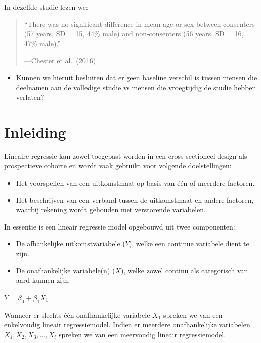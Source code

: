 \documentclass[
]{book}
\providecommand{\tightlist}{%
  \setlength{\itemsep}{0pt}\setlength{\parskip}{0pt}}
\theoremstyle{definition}
\theoremstyle{definition}
\theoremstyle{definition}
\theoremstyle{definition}
\theoremstyle{remark}
\begin{document}
In dezelfde studie lezen we:

\begin{quote}
``There was no significant difference in mean age or sex between consenters (57 years, SD = 15, 44\% male) and non-consenters (56 years, SD = 16, 47\% male).''

---Chester et al.~(2016)
\end{quote}

\begin{itemize}
\tightlist
\item
  Kunnen we hieruit besluiten dat er geen baseline verschil is tussen mensen die deelnamen aan de volledige studie vs mensen die vroegtijdig de studie hebben verlaten?
\end{itemize}

\hypertarget{inleiding-1}{%
\section*{Inleiding}\label{inleiding-1}}


Lineaire regressie kan zowel toegepast worden in een cross-sectioneel design als prospectieve cohorte en wordt vaak gebruikt voor volgende doelstellingen:

\begin{itemize}
\tightlist
\item
  Het voorspellen van een uitkomstmaat op basis van één of meerdere factoren.
\item
  Het beschrijven van een verband tussen de uitkomstmaat en andere factoren, waarbij rekening wordt gehouden met verstorende variabelen.
\end{itemize}

In essentie is een lineair regressie model opgebouwd uit twee componenten:

\begin{itemize}
\tightlist
\item
  De afhankelijke uitkomstvariabele (\(Y\)), welke een continue variabele dient te zijn.
\item
  De onafhankelijke variabele(n) (\(X\)), welke zowel continu als categorisch van aard kunnen zijn.
\end{itemize}

\(Y = \beta_0 + \beta_1 X_1\)

Wanneer er slechts één onafhankelijke variabele \(X_1\) spreken we van een enkelvoudig lineair regressiemodel. Indien er meerdere onafhankelijke variabelen \(X_1, X_2, X_3,..., X_i\) spreken we van een meervoudig lineair regressiemodel.
\end{document}
